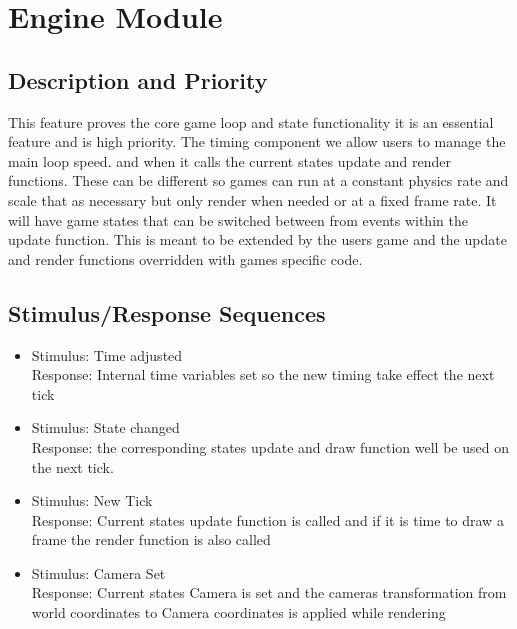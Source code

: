 \documentclass{scrreprt}
\begin{document}


\section{Engine Module}
\subsection{Description and Priority}
This feature proves the core game loop and state functionality it is an essential feature and is high priority.  The timing component we allow users to manage the main loop speed. and when it calls the current states update and render functions.  These can be different so games can run at a constant physics rate and scale that as necessary but only render when needed or at a fixed frame rate.  It will have game states that can be switched between from events within the update function.  This is meant to be extended by the users game and the update and render functions overridden with games specific code.

\subsection{Stimulus/Response Sequences}
\begin{itemize}
\item Stimulus:		Time adjusted\\
	Response: 		Internal time variables set so the new timing take effect the next tick\\
	
\item Stimulus:		State changed\\
	Response: 		the corresponding states update and draw function well be used on the next tick.\\
	
\item Stimulus:		New Tick\\
	Response: 		Current states update function is called and if it is time to draw a frame the render function is also called \\
	
\item Stimulus:		Camera Set\\
	Response: 		Current states Camera is set and the cameras transformation from world coordinates to Camera coordinates is applied while rendering \\

\end{itemize}
\end{document}
